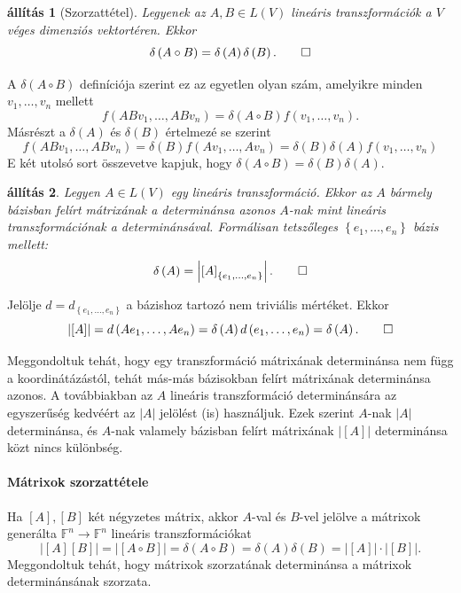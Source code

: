 \documentclass[a4paper, showtrims]{memoir}
\makeatletter
\renewenvironment{proof}[1][\proofname]
    {\par\pushQED{\qed}%
    \normalfont \topsep6\p@\@plus6\p@\relax
    \trivlist
    \item[\hskip\labelsep
        \itshape
    #1\@addpunct{:}]\ignorespaces}
    {\popQED\endtrivlist\@endpefalse}
\theoremstyle{plain}
\newtheorem{proposition}{állítás}[chapter]
\theoremstyle{remark}
\theoremstyle{definition}
\makeatother
\begin{document}
\begin{proposition}[Szorzattétel]
	Legyenek az $A,B\in L\left( V \right)$ lineáris transzformációk a $V$ véges dimenziós vektortéren.
	Ekkor
	\[
		\delta\left( A\circ B\right)
		=
		\delta\left( A\right) \delta\left( B\right).
		\qedhere
	\]
\end{proposition}
\begin{proof}
	A $\delta \left( A\circ B\right) $ definíciója szerint ez az egyetlen olyan
	szám, amelyikre minden $v_{1},\ldots ,v_{n}$ mellett
	\[
		f\left( ABv_{1},\ldots ,ABv_{n}\right) =\delta \left( A\circ B\right)
		f\left( v_{1},\ldots ,v_{n}\right) .
	\]
	Másrészt a $\delta \left( A\right) $ és $\delta \left( B\right) $ értelmezé%
	se szerint
	\[
		f\left( ABv_{1},\ldots ,ABv_{n}\right) =\delta \left( B\right) f\left(
		Av_{1},\ldots ,Av_{n}\right) =\delta \left( B\right) \delta \left( A\right)
		f\left( v_{1},\ldots ,v_{n}\right)
	\]
	E két utolsó sort összevetve kapjuk, hogy $\delta \left( A\circ B\right)
		=\delta \left( B\right) \delta \left( A\right) .$
\end{proof}

\begin{proposition}
	Legyen $A\in L\left( V\right)$ egy lineáris transzformáció.
	Ekkor az $A$ bármely bázisban felírt mátrixának a determinánsa azonos
	$A$-nak mint lineáris transzformációnak a determinánsával.
	Formálisan tetszőleges $\left\{ e_1,\ldots,e_n \right\}$ bázis mellett:
	\[
		\delta \left( A\right)
		=
		\left|
		\left[
			A
			\right]_{\left\{ e_{1},\ldots ,e_{n}\right\} }
		\right|.\qedhere
	\]
\end{proposition}
\begin{proof}
	Jelölje $d=d_{\left\{e_1,\ldots,e_n\right\}}$ a bázishoz tartozó nem triviális mértéket.
	Ekkor
	\[
		\left| \left[ A\right] \right| =d\left( Ae_{1},\ldots ,Ae_{n}\right) =\delta
		\left( A\right) d\left( e_{1},\ldots ,e_{n}\right) =\delta \left( A\right) . \qedhere
	\]
\end{proof}

Meggondoltuk tehát, hogy egy transzformáció mátrixának determinánsa nem függ a koordinátázástól,
tehát más-más bázisokban felírt mátrixának determinánsa azonos.
A továbbiakban az $A$ lineáris transzformáció determinánsára az egyszerűség kedvéért az $|A|$ jelölést (is) használjuk.
Ezek szerint $A$-nak $|A|$ determinánsa,
és $A$-nak valamely bázisban felírt mátrixának $|[A]|$ determinánsa közt nincs különbség.

\paragraph{Mátrixok szorzattétele}
Ha $[A],[B]$ két négyzetes mátrix,
akkor $A$-val és $B$-vel jelölve a
mátrixok generálta $\mathbb{F}^n\to\mathbb{F}^n$ lineáris transzformációkat
\[
	|[A][B]|=|[A\circ B]|=\delta\left( A\circ B \right)=\delta\left( A \right)\delta\left( B \right)=
	|[A]|\cdot|[B]|.
\]
Meggondoltuk tehát, hogy mátrixok szorzatának determinánsa a mátrixok determinánsának szorzata.
\end{document}
